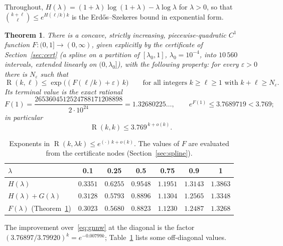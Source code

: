 \documentclass[11pt]{article}
\newtheorem{theorem}{Theorem}[section]
\theoremstyle{definition}
\newcommand{\eps}{\varepsilon}
\newcommand{\lam}{\lambda}
\DeclareMathOperator{\Ram}{R}
\begin{document}
Throughout, $H(\lam)=(1+\lam)\log(1+\lam)-\lam\log\lam$ for $\lam>0$, so that $\binom{k+\ell}{\ell}\le e^{H(\ell/k)k}$ is the Erd\H{o}s--Szekeres bound in exponential form.

\begin{theorem}\label{thm:main}
There is a concave, strictly increasing, piecewise-quadratic $C^1$ function $F\colon(0,1]\to(0,\infty)$, given explicitly by the certificate of Section~\ref{sec:cert} (a spline on a partition of $[\lam_0,1]$, $\lam_0=10^{-4}$, into $10\,560$ intervals, extended linearly on $(0,\lam_0]$), with the following property: for every $\eps>0$ there is $N_\eps$ such that
\[
\Ram(k,\ell)\le\exp\bigl((F(\ell/k)+\eps)\,k\bigr)\qquad\text{for all integers }k\ge\ell\ge1\text{ with }k+\ell\ge N_\eps .
\]
Its terminal value is the exact rational
\[
F(1)=\frac{2653604512524788171208898}{2\cdot10^{24}}=1.32680225\ldots,\qquad e^{F(1)}\le3.7689719<3.769 ;
\]
in particular
\[
\Ram(k,k)\le 3.769^{\,k+o(k)} .
\]
\end{theorem}

\begin{table}[h]\centering\small
\begin{tabular}{@{}lcccccc@{}}\toprule
$\lam$ & 0.1 & 0.25 & 0.5 & 0.75 & 0.9 & 1\\ \midrule
$H(\lam)$ & $0.3351$ & $0.6255$ & $0.9548$ & $1.1951$ & $1.3143$ & $1.3863$\\
$H(\lam)+G(\lam)$~\cite{GNNW} & $0.3128$ & $0.5793$ & $0.8896$ & $1.1304$ & $1.2565$ & $1.3348$\\
$F(\lam)$ (Theorem~\ref{thm:main}) & $0.3023$ & $0.5680$ & $0.8823$ & $1.1230$ & $1.2487$ & $1.3268$\\
\bottomrule
\end{tabular}
\caption{Exponents in $\Ram(k,\lam k)\le e^{(\cdot)\,k+o(k)}$.  The values of $F$ are evaluated from the certificate nodes (Section~\ref{sec:spline}).}\label{tab:values}
\end{table}

The improvement over~\eqref{eq:gnnw} at the diagonal is the factor $(3.76897/3.79920)^k=e^{-0.00799k}$; Table~\ref{tab:values} lists some off-diagonal values.
\end{document}
